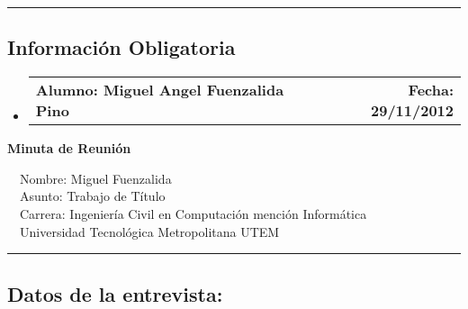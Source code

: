 \documentclass[10pt,letterpaper]{article}
\makeatletter
\newcommand{\headerrow}[2]
{\begin{tabular*}{\linewidth}{l@{\extracolsep{\fill}}r}
	#1 &
	#2 \\
\end{tabular*}}
\makeatother
\begin{document}
\hrule
\vspace{-0.4em}
\subsection*{Información Obligatoria}

\begin{itemize}
	\parskip=0.1em

	\item 
	\headerrow
		{\textbf{Alumno: Miguel Angel Fuenzalida Pino}}
		{\textbf{Fecha: 29/11/2012}}

\end{itemize}
\newpage
\begin{center}
{\LARGE \textbf{Minuta de Reunión}}

\ \ \textbullet Nombre: Miguel Fuenzalida
\\
\ \ \textbullet Asunto: Trabajo de Título
\\
\ \ \textbullet Carrera: Ingeniería Civil en Computación mención Informática
\\
\ \ \textbullet Universidad Tecnológica Metropolitana UTEM
\end{center}

\hrule
\vspace{-0.4em}
\subsection*{Datos de la entrevista:}
\end{document}
